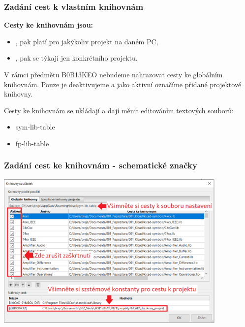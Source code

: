 \documentclass{beamer}
\begin{document}
\begin{frame}
	\frametitle{Zadání cest k vlastním knihovnám}
	
	\textbf{Cesty ke knihovnám jsou:}
	\begin{itemize}
		\item {}, pak platí pro jakýkoliv projekt na daném PC,
		\item {}, pak se týkají jen konkrétního projektu.
	\end{itemize}
	
	\vspace{0.3cm}
	V rámci předmětu B0B13KEO nebudeme nahrazovat cesty ke globálním knihovnám. Pouze je deaktivujeme a jako aktivní označíme přidané projektové knihovny.
	
	\vspace{0.3cm}
	Cesty ke knihovnám se ukládají a dají měnit editováním textových souborů:
	
	\begin{itemize}
		\item sym-lib-table
		\item fp-lib-table
	\end{itemize}
		
\end{frame}
\begin{frame}
	\frametitle{Zadání cest ke knihovnám - schematické značky}

		\begin{center}
			\includegraphics[width=0.85\textwidth]{obr/knihovny02.png}
		\end{center}
		
\end{frame}
\end{document}
